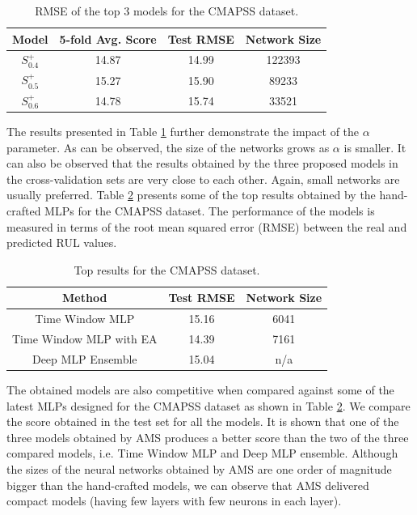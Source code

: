 \documentclass[12pt]{elsart}%
\begin{document}
\begin{table}[!htb]
\begin{center}
\begin{tabular}{| c | c | c | c |}
\hline
Model & 5-fold Avg. Score & Test RMSE & Network Size\\
\hline
$S^+_{0.4}$ & 14.87 & 14.99 & 122393\\
$S^+_{0.5}$ & 15.27 & 15.90 & 89233\\
$S^+_{0.6}$ & 14.78 & 15.74 & 33521\\
\hline
\end{tabular}
\end{center}
\caption{RMSE of the top 3 models for the CMAPSS dataset.}
\label{table:avg_rmse_cmapss}
\end{table}

The results presented in Table \ref{table:avg_rmse_cmapss} further demonstrate the impact of the $\alpha$ parameter. As can be observed, the size of the networks grows as $\alpha$ is smaller. It can also be observed that the results obtained by the three proposed models in the cross-validation sets are very close to each other. Again, small networks are usually preferred.
Table \ref{table:CMAPSS_results_top} presents some of the top results obtained by the hand-crafted MLPs for the CMAPSS dataset. The performance of the models is measured in terms of the root mean squared error (RMSE) between the real and predicted RUL values. 

\begin{table}[!htb]
\begin{center}
\begin{tabular}{| c | c | c |}
\hline
Method & Test RMSE & Network Size \\
\hline
Time Window MLP \cite{Lim2016} & 15.16 & 6041\\
Time Window MLP with EA \cite{Laredo2018} & 14.39 & 7161\\
Deep MLP Ensemble \cite{Zhang2016} & 15.04 &  n/a \\
\hline
\end{tabular}
\end{center}
\caption{Top results for the CMAPSS dataset.}
\label{table:CMAPSS_results_top}
\end{table}

The obtained models are also competitive when compared against some of the latest MLPs designed for the CMAPSS dataset as shown in Table \ref{table:CMAPSS_results_top}. We compare the score obtained in the test set for all the models. It is shown that one of the three models obtained by AMS produces a better score than the two of the three compared models, i.e. Time Window MLP and Deep MLP ensemble. Although the sizes of the neural networks obtained by AMS are one order of magnitude bigger than the hand-crafted models, we can observe that AMS delivered compact models (having few layers with few neurons in each layer).
\end{document}

